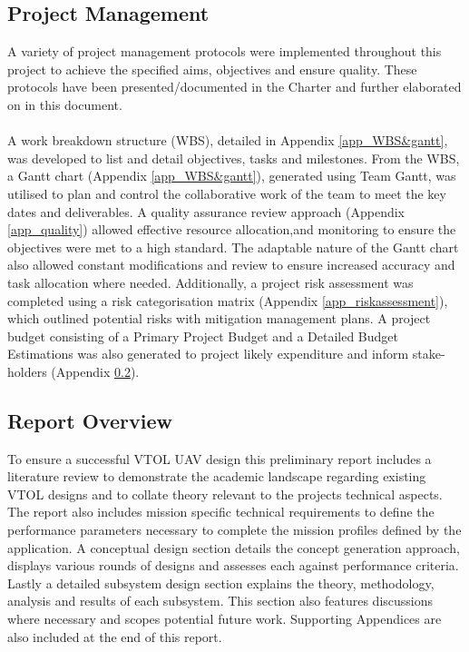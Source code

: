\subsection{Project Management}
A variety of project management protocols were implemented throughout this project to achieve the specified aims, objectives and ensure quality. These protocols have been presented/documented in the Charter and further elaborated on in this document. \\
\\
A work breakdown structure (WBS), detailed in Appendix \ref{app_WBS&gantt}, was developed to list and detail objectives, tasks and milestones. From the WBS, a Gantt chart (Appendix \ref{app_WBS&gantt}), generated using Team Gantt, was utilised to plan and control the collaborative work of the team to meet the key dates and deliverables. A quality assurance review approach (Appendix \ref{app_quality}) allowed effective resource allocation,and monitoring to ensure the objectives were met to a high standard. The adaptable nature of the Gantt chart also allowed constant modifications and review to ensure increased accuracy and task allocation where needed. Additionally, a project risk assessment was completed using a risk categorisation matrix (Appendix \ref{app_riskassessment}), which outlined potential risks with mitigation management plans. A project budget consisting of a Primary Project Budget and a Detailed Budget Estimations was also generated to project likely expenditure and inform stake-holders (Appendix \ref{}). 

\subsection{Report Overview}
To ensure a successful VTOL UAV design this preliminary report includes a literature review to demonstrate the academic landscape regarding existing VTOL designs and to collate theory relevant to the projects technical aspects. The report also includes mission specific technical requirements to define the performance parameters necessary to complete the mission profiles defined by the application. A conceptual design section details the concept generation approach, displays various rounds of designs and assesses each against performance criteria. Lastly a detailed subsystem design section explains the theory, methodology, analysis and results of each subsystem. This section also features discussions where necessary and scopes potential future work. Supporting Appendices are also included at the end of this report.

